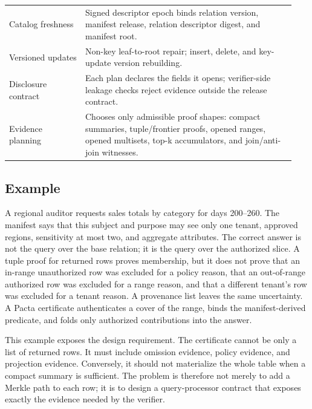 \documentclass[conference]{IEEEtran}
\newcommand{\sys}{Pacta\xspace}
\begin{document}
\begin{table}[t]
{\begin{tabular}{@{}p{0.25\linewidth}p{0.69\linewidth}@{}}
Catalog freshness & Signed descriptor epoch binds relation version, manifest release, relation descriptor digest, and manifest root. \\
Versioned updates & Non-key leaf-to-root repair; insert, delete, and key-update version rebuilding. \\
Disclosure contract & Each plan declares the fields it opens; verifier-side leakage checks reject evidence outside the release contract. \\
Evidence planning & Chooses only admissible proof shapes: compact summaries, tuple/frontier proofs, opened ranges, opened multisets, top-k accumulators, and join/anti-join witnesses. \\
\bottomrule
\end{tabular}
}
\end{table}

\subsection{Example}
A regional auditor requests sales totals by category for days 200--260. The manifest says that this subject and purpose may see only one tenant, approved regions, sensitivity at most two, and aggregate attributes. The correct answer is not the query over the base relation; it is the query over the authorized slice. A tuple proof for returned rows proves membership, but it does not prove that an in-range unauthorized row was excluded for a policy reason, that an out-of-range authorized row was excluded for a range reason, and that a different tenant's row was excluded for a tenant reason. A provenance list leaves the same uncertainty. A \sys certificate authenticates a cover of the range, binds the manifest-derived predicate, and folds only authorized contributions into the answer.

This example exposes the design requirement. The certificate cannot be only a list of returned rows. It must include omission evidence, policy evidence, and projection evidence. Conversely, it should not materialize the whole table when a compact summary is sufficient. The problem is therefore not merely to add a Merkle path to each row; it is to design a query-processor contract that exposes exactly the evidence needed by the verifier.
\end{document}
